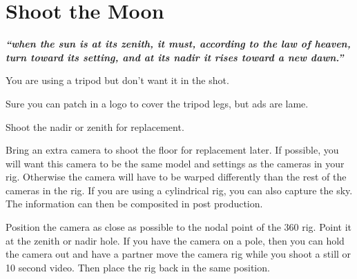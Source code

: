 \chapter{Shoot the Moon}
\pagecolor{white}
\label{chap:13}
\begin{fullwidth}


{\itshape\bfseries “when the sun is at its zenith, it must, according to the law of heaven, turn toward its setting, and at its nadir it rises toward a new dawn.”}

\vspace{\baselineskip}

\problem

{\large You are using a tripod but don’t want it in the shot. \par}

Sure you can patch in a logo to cover the tripod legs, but ads are lame. 


\solution

{\large Shoot the nadir or zenith for replacement. \par}

Bring an extra camera to shoot the floor for replacement later. If possible, you will want this camera to be the same model and settings as the cameras in your rig. Otherwise the camera will have to be warped differently than the rest of the cameras in the rig. If you are using a cylindrical rig, you can also capture the sky. The information can then be composited in post production.

Position the camera as close as possible to the nodal point of the 360 rig. Point it at the zenith or nadir hole. If you have the camera on a pole, then you can hold the camera out and have a partner move the camera rig while you shoot a still or 10 second video. Then place the rig back in the same position. 




\clearpage
\end{fullwidth}
